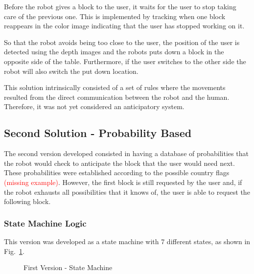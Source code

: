Before the robot gives a block to the user, it waits for the user to stop taking care of the previous one. This is implemented by tracking when one block reappears in the color image indicating that the user has stopped working on it.

So that the robot avoids being too close to the user, the position of the user is detected using the depth images and the robots puts down a block in the opposite side of the table. Furthermore, if the user switches to the other side the robot will also switch the put down location.
\fi

This solution intrinsically consisted of a set of rules where the movements resulted from the direct communication between the robot and the human. Therefore, it was not yet considered an anticipatory system.

\subsection{Second Solution - Probability Based}

The second version developed consisted in having a database of probabilities that the robot would check to anticipate the block that the user would need next. These probabilities were established according to the possible country flags \textcolor{red}{(missing example)}. However, the first block is still requested by the user and, if the robot exhausts all possibilities that it knows of, the user is able to request the following block.

\subsubsection{State Machine Logic}

This version was developed as a state machine with 7 different states, as shown in  Fig.~\ref{fig:demo1_state_machine}.

\begin{figure}[H]%
    \centering
    
    \caption{First Version - State Machine}
    \label{fig:demo1_state_machine}
\end{figure}\fi

